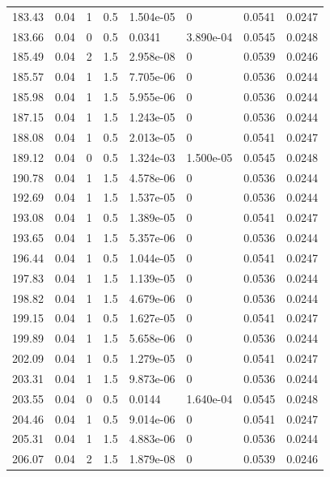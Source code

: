 \documentclass[preview]{standalone}
\begin{document}
{{{\begin{tabular}{L{1.2cm}C{1.2cm} C{0.3cm}C{0.5cm} C{1.4cm}C{1.4cm} C{1.4cm}C{1.4cm}}
  183.43  &  0.04  & 1     & 0.5 &  1.504e-05  & 0  & 0.0541 &  0.0247   \\ 
  183.66  &  0.04  & 0     & 0.5 &  0.0341  & 3.890e-04  & 0.0545 &  0.0248   \\ 
  185.49  &  0.04  & 2     & 1.5 &  2.958e-08  & 0  & 0.0539 &  0.0246   \\ 
  185.57  &  0.04  & 1     & 1.5 &  7.705e-06  & 0  & 0.0536 &  0.0244   \\ 
  185.98  &  0.04  & 1     & 1.5 &  5.955e-06  & 0  & 0.0536 &  0.0244   \\ 
  187.15  &  0.04  & 1     & 1.5 &  1.243e-05  & 0  & 0.0536 &  0.0244   \\ 
  188.08  &  0.04  & 1     & 0.5 &  2.013e-05  & 0  & 0.0541 &  0.0247   \\ 
  189.12  &  0.04  & 0     & 0.5 &  1.324e-03  & 1.500e-05  & 0.0545 &  0.0248   \\ 
  190.78  &  0.04  & 1     & 1.5 &  4.578e-06  & 0  & 0.0536 &  0.0244   \\ 
  192.69  &  0.04  & 1     & 1.5 &  1.537e-05  & 0  & 0.0536 &  0.0244   \\ 
  193.08  &  0.04  & 1     & 0.5 &  1.389e-05  & 0  & 0.0541 &  0.0247   \\ 
  193.65  &  0.04  & 1     & 1.5 &  5.357e-06  & 0  & 0.0536 &  0.0244   \\ 
  196.44  &  0.04  & 1     & 0.5 &  1.044e-05  & 0  & 0.0541 &  0.0247   \\ 
  197.83  &  0.04  & 1     & 1.5 &  1.139e-05  & 0  & 0.0536 &  0.0244   \\ 
  198.82  &  0.04  & 1     & 1.5 &  4.679e-06  & 0  & 0.0536 &  0.0244   \\ 
  199.15  &  0.04  & 1     & 0.5 &  1.627e-05  & 0  & 0.0541 &  0.0247   \\ 
  199.89  &  0.04  & 1     & 1.5 &  5.658e-06  & 0  & 0.0536 &  0.0244   \\ 
  202.09  &  0.04  & 1     & 0.5 &  1.279e-05  & 0  & 0.0541 &  0.0247   \\ 
  203.31  &  0.04  & 1     & 1.5 &  9.873e-06  & 0  & 0.0536 &  0.0244   \\ 
  203.55  &  0.04  & 0     & 0.5 &  0.0144  & 1.640e-04  & 0.0545 &  0.0248   \\ 
  204.46  &  0.04  & 1     & 0.5 &  9.014e-06  & 0  & 0.0541 &  0.0247   \\ 
  205.31  &  0.04  & 1     & 1.5 &  4.883e-06  & 0  & 0.0536 &  0.0244   \\ 
  206.07  &  0.04  & 2     & 1.5 &  1.879e-08  & 0  & 0.0539 &  0.0246   \\ 

\end{tabular}}}}
\end{document}
